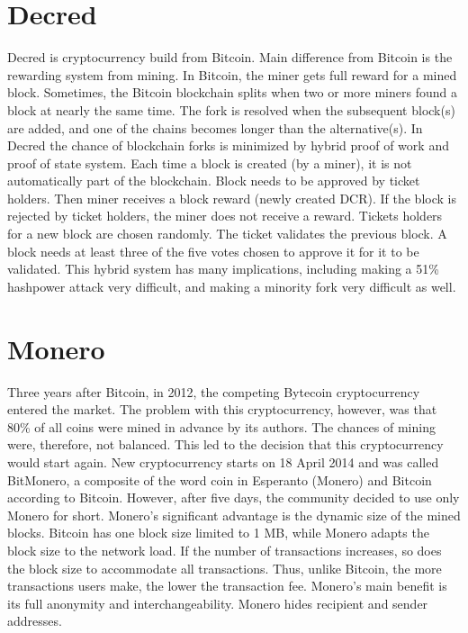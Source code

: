 \section{Decred}
Decred is cryptocurrency build from Bitcoin. Main difference from Bitcoin is the rewarding system from mining. In Bitcoin, the miner gets full reward for a mined block. Sometimes, the Bitcoin blockchain splits when two or more miners found a block at nearly the same time. The fork is resolved when the subsequent block(s) are added, and one of the chains becomes longer than the alternative(s). In Decred the chance of blockchain forks is minimized by hybrid proof of work and proof of state system. Each time a block is created (by a miner), it is not automatically part of the blockchain. Block needs to be approved by ticket holders. Then miner receives a block reward (newly created DCR). If the block is rejected by ticket holders, the miner does not receive a reward. Tickets holders for a new block are chosen randomly. The ticket validates the previous block. A block needs at least three of the five votes chosen to approve it for it to be validated.  This hybrid system has many implications, including making a 51\% hashpower attack very difficult, and making a minority fork very difficult as well.\cite{decredWhitePaper}

\section{Monero}
Three years after Bitcoin, in 2012, the competing Bytecoin cryptocurrency entered the market. The problem with this cryptocurrency, however, was that 80\% of all coins were mined in advance by its authors. The chances of mining were, therefore, not balanced. This led to the decision that this cryptocurrency would start again. New cryptocurrency starts on 18 April 2014 and was called BitMonero, a composite of the word coin in Esperanto (Monero) and Bitcoin according to Bitcoin. However, after five days, the community decided to use only Monero for short. Monero's significant advantage is the dynamic size of the mined blocks. Bitcoin has one block size limited to 1 MB, while Monero adapts the block size to the network load. If the number of transactions increases, so does the block size to accommodate all transactions. Thus, unlike Bitcoin, the more transactions users make, the lower the transaction fee. Monero's main benefit is its full anonymity and interchangeability. Monero hides recipient and sender addresses.\cite{moneroTracebility}
